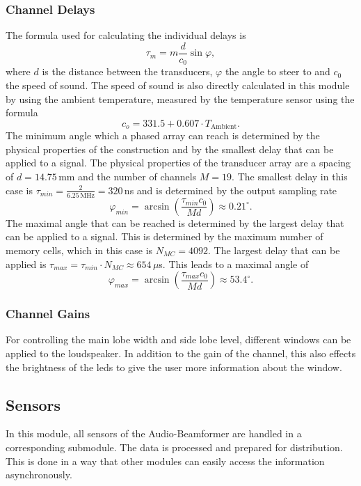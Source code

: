 \subsubsection{Channel Delays} \label{beamsteering_delays}
The formula used for calculating the individual delays is
\begin{equation}
    \tau_m = m\frac{d}{c_0}\sin{\varphi},
\end{equation}
where $d$ is the distance between the transducers, $\varphi$ the angle to steer to and $c_0$ the speed of sound. The speed of sound is also directly calculated in this module by using the ambient temperature, measured by the temperature sensor using the formula \cite{speed_of_sound}
\begin{equation}
    c_o = 331.5 + 0.607 \cdot T_{\text{Ambient}}.
    \label{equ:speed_of_sound}
\end{equation}
The minimum angle which a phased array can reach is determined by the physical properties of the construction and by the smallest delay that can be applied to a signal. The physical properties of the transducer array are a spacing of $d=14.75 \,$mm and the number of channels $M=19$. The smallest delay in this case is $\tau_{min} = \frac{2}{6.25 \,\text{MHz}} = 320\,$ns and is determined by the output sampling rate
\begin{equation}
    \varphi_{min} = \arcsin{\left ( \frac{\tau_{min} c_0}{M d} \right ) } \approx  0.21^{\circ}.
\end{equation}
The maximal angle that can be reached is determined by the largest delay that can be applied to a signal. This is determined by the maximum number of memory cells, which in this case is $N_{MC} = 4092$. The largest delay that can be applied is $\tau_{max} = \tau_{min} \cdot N_{MC} \approx 654 \, \mu$s. This leads to a maximal angle of 
\begin{equation}
    \varphi_{max} = \arcsin{\left ( \frac{\tau_{max} c_0}{M d} \right ) } \approx  53.4^{\circ}.
\end{equation}
\subsubsection{Channel Gains}
For controlling the main lobe width and side lobe level, different windows can be applied to the loudspeaker. In addition to the gain of the channel, this also effects the brightness of the \acrshort{led}s to give the user more information about the window. 
\subsection{Sensors}
In this module, all sensors of the Audio-Beamformer are handled in a corresponding submodule. The data is processed and prepared for distribution. This is done in a way that other modules can easily access the  information asynchronously. 
